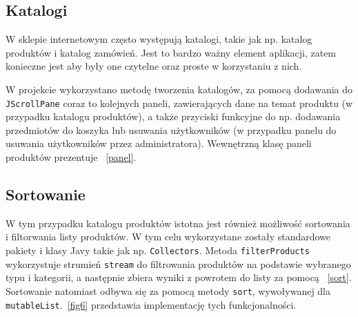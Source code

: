 \subsection{Katalogi}

W sklepie internetowym często występują katalogi, takie jak np. katalog produktów i katalog zamówień. Jest to bardzo ważny element aplikacji, zatem konieczne jest aby były one czytelne oraz proste w korzystaniu z nich.

W projekcie wykorzystano metodę tworzenia katalogów, za pomocą dodawania do \texttt{JScrollPane} coraz to kolejnych paneli, zawierających dane na temat produktu (w przypadku katalogu produktów), a także przyciski funkcyjne
do np. dodawania przedmiotów do koszyka lub usuwania użytkowników (w przypadku panelu do usuwania użytkowników przez administratora). Wewnętrzną klasę paneli produktów prezentuje \listingname~\ref{panel}.



\subsection{Sortowanie}

W tym przypadku katalogu produktów istotna jest również możliwość sortowania i filtorwania listy produktów. W tym celu wykorzystane zostały standardowe pakiety i klasy Javy takie jak np. \texttt{Collectors}.
Metoda \texttt{filterProducts} wykorzystuje strumień \texttt{stream} do filtrowania produktów na podstawie wybranego typu i kategorii, a następnie zbiera wyniki z powrotem do listy za pomocą \listingname~\ref{sort}.
Sortowanie natomiast odbywa się za pomocą metody \texttt{sort}, wywoływanej dla \texttt{mutableList}.\figurename~\ref{fig6} przedstawia implementację tych funkcjonalności.

